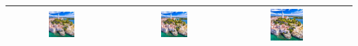 \documentclass[a4paper,12pt]{article}
\begin{document}
\begin{table}[h!]
\begin{tabular}{|c|c|c|c|}
        \includegraphics[width=0.25\textwidth, angle=90]{rovinj.png} &
        \includegraphics[width=0.25\textwidth, angle=180]{rovinj.png} &
        \includegraphics[width=0.3125\textwidth]{rovinj.png} \\
        \hline
    \end{tabular}
    \label{tab:image_table}
\end{table}
\end{document}
